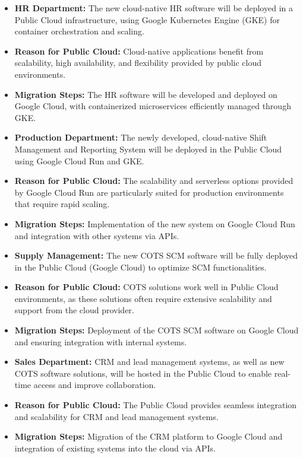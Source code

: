 \begin{itemize}
    \item \textbf{HR Department:} The new cloud-native HR software will be deployed in a Public Cloud infrastructure, using Google Kubernetes Engine (GKE) for container orchestration and scaling.
    \item \textbf{Reason for Public Cloud:} Cloud-native applications benefit from scalability, high availability, and flexibility provided by public cloud environments.
    \item \textbf{Migration Steps:} The HR software will be developed and deployed on Google Cloud, with containerized microservices efficiently managed through GKE.
    \item \textbf{Production Department:} The newly developed, cloud-native Shift Management and Reporting System will be deployed in the Public Cloud using Google Cloud Run and GKE.
    \item \textbf{Reason for Public Cloud:} The scalability and serverless options provided by Google Cloud Run are particularly suited for production environments that require rapid scaling.
    \item \textbf{Migration Steps:} Implementation of the new system on Google Cloud Run and integration with other systems via APIs.
    \item \textbf{Supply Management:} The new COTS SCM software will be fully deployed in the Public Cloud (Google Cloud) to optimize SCM functionalities.
    \item \textbf{Reason for Public Cloud:} COTS solutions work well in Public Cloud environments, as these solutions often require extensive scalability and support from the cloud provider.
    \item \textbf{Migration Steps:} Deployment of the COTS SCM software on Google Cloud and ensuring integration with internal systems.
    \item \textbf{Sales Department:} CRM and lead management systems, as well as new COTS software solutions, will be hosted in the Public Cloud to enable real-time access and improve collaboration.
    \item \textbf{Reason for Public Cloud:} The Public Cloud provides seamless integration and scalability for CRM and lead management systems.
    \item \textbf{Migration Steps:} Migration of the CRM platform to Google Cloud and integration of existing systems into the cloud via APIs.
\end{itemize}


